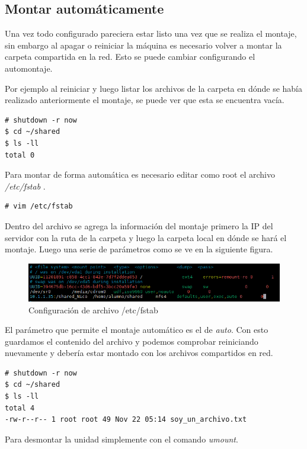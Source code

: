 \documentclass[12pt]{article}
\begin{document}
\subsection{Montar automáticamente}

Una vez todo configurado pareciera estar listo una vez que se realiza el montaje, sin embargo al apagar o reiniciar la máquina es necesario volver a montar la carpeta compartida en la red. Esto se puede cambiar configurando el automontaje.


Por ejemplo al reiniciar y luego listar los archivos de la carpeta en dónde se había realizado anteriormente el montaje, se puede ver que esta se encuentra vacía.
\begin{lstlisting}[frame=single]
# shutdown -r now
$ cd ~/shared
$ ls -ll
total 0
\end{lstlisting}
\newpage
Para montar de forma automática es necesario editar como root el archivo \emph{/etc/fstab} .
\begin{lstlisting}[frame=single]
# vim /etc/fstab
\end{lstlisting}

Dentro del archivo se agrega la información del montaje primero la IP del servidor con la ruta de la carpeta y luego la carpeta local en dónde se hará el montaje. Luego una serie de parámetros como se ve en la siguiente figura. 

\begin{figure}[!h]
   \centering
   \includegraphics[scale=.85]{imgs/nfs_auto.PNG}
   \caption{Configuración de archivo /etc/fstab}
   \label{fig10}
\end{figure}

El parámetro que permite el montaje automático es el de \emph{auto}. Con esto guardamos el contenido del archivo y podemos comprobar reiniciando nuevamente y debería estar montado con los archivos compartidos en red.

\begin{lstlisting}[frame=single]
# shutdown -r now
$ cd ~/shared
$ ls -ll
total 4
-rw-r--r-- 1 root root 49 Nov 22 05:14 soy_un_archivo.txt
\end{lstlisting}

Para desmontar la unidad simplemente con el comando \emph{umount}.
\end{document}
